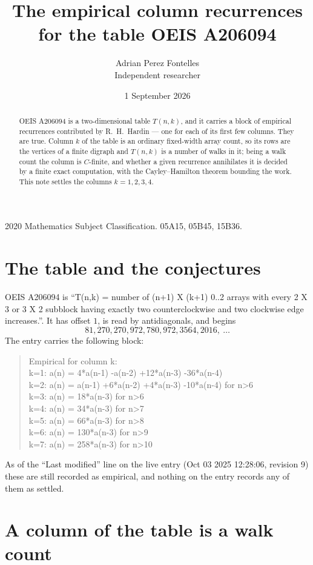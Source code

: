 \documentclass[11pt,a4paper]{article}
\title{The empirical column recurrences for the table OEIS A206094}
\author{Adrian Perez Fontelles\\ \small Independent researcher}
\date{1 September 2026}
\theoremstyle{plain}
\theoremstyle{definition}
\begin{document}
\maketitle

\begin{abstract}
OEIS A206094 is a two-dimensional table $T(n,k)$, and it carries a block of empirical
recurrences contributed by R.~H.~Hardin --- one for each of its first few columns. They are
true. Column $k$ of the table is an ordinary fixed-width array count, so its rows are the
vertices of a finite digraph and $T(n,k)$ is a number of walks in it; being a walk count the
column is $C$-finite, and whether a given recurrence annihilates it is decided by a finite
exact computation, with the Cayley--Hamilton theorem bounding the work. This note settles the columns $k=1, 2, 3, 4$.
\end{abstract}

\noindent\small 2020 Mathematics Subject Classification. 05A15, 05B45, 15B36.\normalsize

\section{The table and the conjectures}

OEIS A206094 is ``T(n,k) = number of (n+1) X (k+1) 0..2 arrays with every 2 X 3 or 3 X 2 subblock having exactly two counterclockwise and two clockwise edge increases.''. It has offset $1$, is
read by antidiagonals, and begins
\[
81, 270, 270, 972, 780, 972, 3564, 2016,\ \dots
\]
The entry carries the following block:
\begin{quote}\small
Empirical for column k:\\
k=1: a(n) = 4*a(n-1) -a(n-2) +12*a(n-3) -36*a(n-4)\\
k=2: a(n) = a(n-1) +6*a(n-2) +4*a(n-3) -10*a(n-4) for n>6\\
k=3: a(n) = 18*a(n-3) for n>6\\
k=4: a(n) = 34*a(n-3) for n>7\\
k=5: a(n) = 66*a(n-3) for n>8\\
k=6: a(n) = 130*a(n-3) for n>9\\
k=7: a(n) = 258*a(n-3) for n>10\\
\end{quote}
As of the ``Last modified'' line on the live entry (Oct 03 2025 12:28:06, revision 9) these are still
recorded as empirical, and nothing on the entry records any of them as settled.

\section{A column of the table is a walk count}
\end{document}
